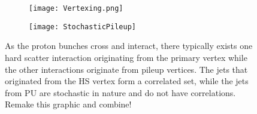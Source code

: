 


\begin{figure}[h]
\centering
\begin{subfigure}{.45\textwidth}
  \centering
  \texttt{[image: Vertexing.png]}
  \caption{}
  \label{fig:sub1}
\end{subfigure}%
\begin{subfigure}{.45\textwidth}
  \centering
  \texttt{[image: StochasticPileup]}
  \caption{}
  \label{fig:sub2}
\end{subfigure}
  \caption{As the proton bunches cross and interact, there typically exists one hard scatter interaction originating from the primary vertex while the other interactions originate from pileup vertices. The jets that originated from the HS vertex form a correlated set, while the jets from PU are stochastic in nature and do not have correlations. Remake this graphic and combine!}
\label{fig:PileupJets}
\end{figure}

